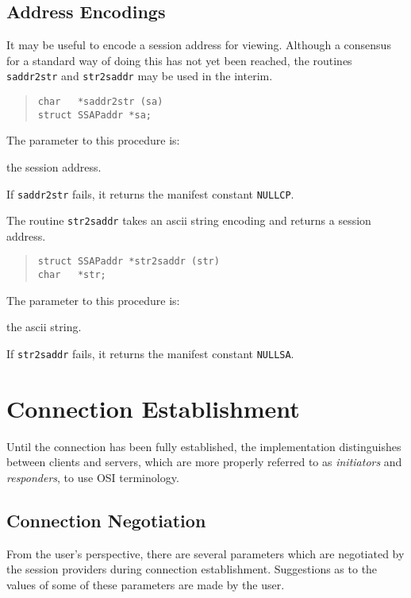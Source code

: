 \subsection	{Address Encodings}
It may be useful to encode a session address for viewing.
Although a consensus for a standard way of doing this has not yet been
reached,
the routines \verb"saddr2str" and \verb"str2saddr" may be used in the interim.
\begin{quote}\small\begin{verbatim}
char   *saddr2str (sa)
struct SSAPaddr *sa;
\end{verbatim}\end{quote}
The parameter to this procedure is:
\begin{describe}
\item[\verb"sa":] the session address.
\end{describe}
If \verb"saddr2str" fails,
it returns the manifest constant \verb"NULLCP".

The routine \verb"str2saddr" takes an ascii string encoding and
returns a
session address.
\begin{quote}\small\begin{verbatim}
struct SSAPaddr *str2saddr (str)
char   *str;
\end{verbatim}\end{quote}
The parameter to this procedure is:
\begin{describe}
\item[\verb"str":] the ascii string.
\end{describe}
If \verb"str2saddr" fails,
it returns the manifest constant \verb"NULLSA".

\section	{Connection Establishment}
Until the connection has been fully established,
the implementation distinguishes between clients and servers,
which are more properly referred to as {\em initiators\/} and
{\em responders}, to use OSI terminology.

\subsection	{Connection Negotiation}\label{ssap:negotiation}
From the user's perspective,
there are several parameters which are negotiated by the session providers
during connection establishment.
Suggestions as to the values of some of these parameters are made by the user.


